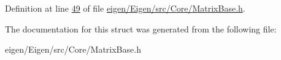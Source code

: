 Definition at line \hyperlink{eigen_2_eigen_2src_2_core_2_matrix_base_8h_source_l00049}{49} of file \hyperlink{eigen_2_eigen_2src_2_core_2_matrix_base_8h_source}{eigen/\+Eigen/src/\+Core/\+Matrix\+Base.\+h}.



The documentation for this struct was generated from the following file\+:\begin{DoxyCompactItemize}
\item 
eigen/\+Eigen/src/\+Core/\+Matrix\+Base.\+h\end{DoxyCompactItemize}

